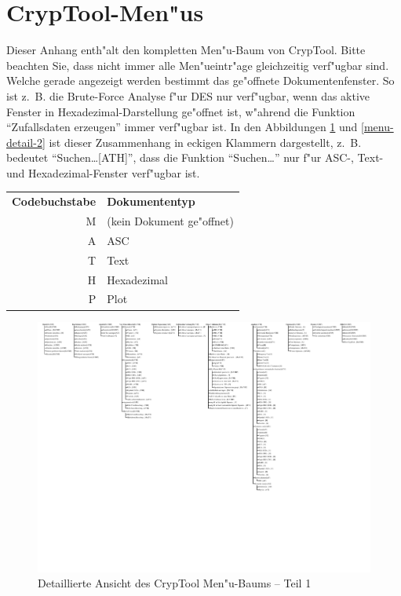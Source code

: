 \pagebreak
\enlargethispage{1cm}
\section{CrypTool-Men"us}
Dieser Anhang enth"alt den kompletten Men"u-Baum von CrypTool. Bitte beachten
Sie, dass nicht immer alle Men"ueintr"age gleichzeitig verf"ugbar sind. Welche
gerade angezeigt werden bestimmt das ge"offnete Dokumentenfenster. So ist z.~B.
die Brute-Force Analyse f"ur DES nur verf"ugbar, wenn das aktive Fenster in
Hexadezimal-Darstellung ge"offnet ist, w"ahrend die Funktion "`Zufallsdaten
erzeugen"' immer verf"ugbar ist. In den Abbildungen \ref{menu-detail-1} und
\ref{menu-detail-2} ist dieser Zusammenhang in eckigen Klammern dargestellt,
z.~B. bedeutet "`Suchen\dots[ATH]"', dass die Funktion "`Suchen\dots"' nur f"ur
ASC-, Text- und Hexadezimal-Fenster verf"ugbar ist.
\begin{center}
\begin{tabular}{rl}
\bf Codebuchstabe & \bf Dokumententyp \\
M & (kein Dokument ge"offnet)\\
A & ASC\\
T & Text\\
H & Hexadezimal\\
P & Plot\\
\end{tabular}
\end{center}

\nobreak

\begin{figure}[!hb]
\begin{center}
\includegraphics[scale=1.1, clip, viewport=10 360 400 600]{figures/cryptool-menu-detail-de}
\caption{Detaillierte Ansicht des CrypTool Men"u-Baums -- Teil 1}
\label{menu-detail-1}
\end{center}
\end{figure}

